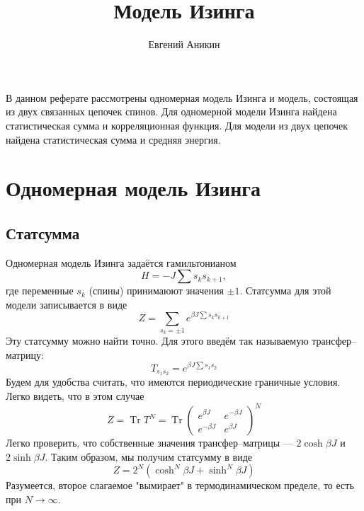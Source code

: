 \documentclass{article}
\title{Модель Изинга}
\author{Евгений Аникин}
\begin{document}
	\maketitle
	В данном реферате рассмотрены одномерная модель Изинга и модель, состоящая из двух
	связанных цепочек спинов. Для одномерной модели Изинга найдена статистическая сумма 
	и корреляционная функция. Для модели из двух цепочек найдена статистическая сумма и 
	средняя энергия.

	\section{Одномерная модель Изинга}
		\subsection{Статсумма}
		Одномерная модель Изинга задаётся гамильтонианом
		\begin{equation}
			\label{ising1d}
			H = -J\sum s_k s_{k+1},
		\end{equation}
		где переменные $s_k$ (спины) принимаюют значения $\pm 1$. Статсумма для этой модели
		записывается в виде
		\begin{equation}
			Z = \sum_{s_k = \pm 1} e^{\beta J\sum s_k s_{k+1}}
		\end{equation}
		Эту статсумму можно найти точно. Для этого введём так называемую трансфер--матрицу:
		\begin{equation}
			\label{transfermatrix}
			T_{s_1s_2} = e^{\beta J\sum s_1 s_2}
		\end{equation}
		Будем для удобства считать, что имеются периодические граничные условия.
		Легко видеть, что в этом случае
		\begin{equation}
			Z = \mathop{\mathrm{Tr}} T^N = \mathop{\mathrm{Tr}} 
			\left (
			\begin{matrix}
				e^{\beta J} & e^{-\beta J} \\
				e^{-\beta J} & e^{\beta J}
			\end{matrix}
			\right )^N
		\end{equation}
		Легко проверить, что собственные значения трансфер--матрицы --- $2\cosh{\beta J}$ и 
		$2\sinh{\beta J}$. Таким образом, мы получим статсумму в виде
		\begin{equation}
			\label{partfunc}
			Z = 2^N(\cosh^N{\beta J} + \sinh^N{\beta J})
		\end{equation}
		Разумеется, второе слагаемое "вымирает" в термодинамическом пределе, то есть при 
		$N \to \infty$.
		
\end{document}
